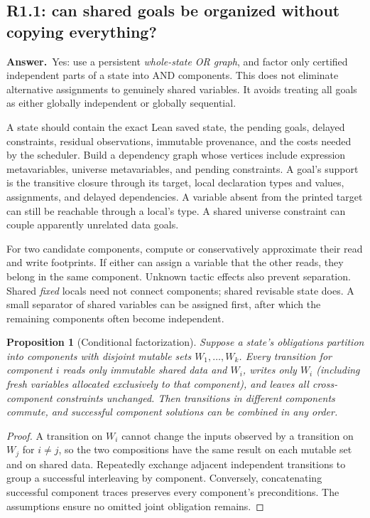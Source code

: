 \documentclass[11pt,a4paper]{article}
\newtheorem{proposition}{Proposition}[section]
\theoremstyle{definition}
\theoremstyle{remark}
\newcommand{\ans}{\noindent\textbf{Answer.}\ }
\begin{document}
\subsection{R1.1: can shared goals be organized without copying everything?}\label{q:R1.1}
\ans Yes: use a persistent \emph{whole-state OR graph}, and factor only certified
independent parts of a state into AND components. This does not eliminate
alternative assignments to genuinely shared variables. It avoids treating
all goals as either globally independent or globally sequential.

A state should contain the exact Lean saved state, the pending goals, delayed
constraints, residual observations, immutable provenance, and the costs needed
by the scheduler. Build a dependency graph whose vertices include expression
metavariables, universe metavariables, and pending constraints. A goal's support
is the transitive closure through its target, local declaration types and
values, assignments, and delayed dependencies. A variable absent from the
printed target can still be reachable through a local's type. A shared
universe constraint can couple apparently unrelated data goals.

For two candidate components, compute or conservatively approximate their
read and write footprints. If either can assign a variable that the other
reads, they belong in the same component. Unknown tactic effects also prevent
separation. Shared \emph{fixed} locals need not connect components; shared
revisable state does. A small separator of shared variables can be assigned
first, after which the remaining components often become independent.

\begin{proposition}[Conditional factorization]\label{prop:factor}
Suppose a state's obligations partition into components with disjoint mutable
sets $W_1,\ldots,W_k$. Every transition for component $i$ reads only immutable
shared data and $W_i$, writes only $W_i$ (including fresh variables allocated
exclusively to that component), and leaves all cross-component
constraints unchanged. Then transitions in different components commute, and
successful component solutions can be combined in any order.
\end{proposition}
\begin{proof}
A transition on $W_i$ cannot change the inputs observed by a transition on
$W_j$ for $i\ne j$, so the two compositions have the same result on each
mutable set and on shared data. Repeatedly exchange adjacent independent
transitions to group a successful interleaving by component. Conversely,
concatenating successful component traces preserves every component's
preconditions. The assumptions ensure no omitted joint obligation remains.
\end{proof}
\end{document}
